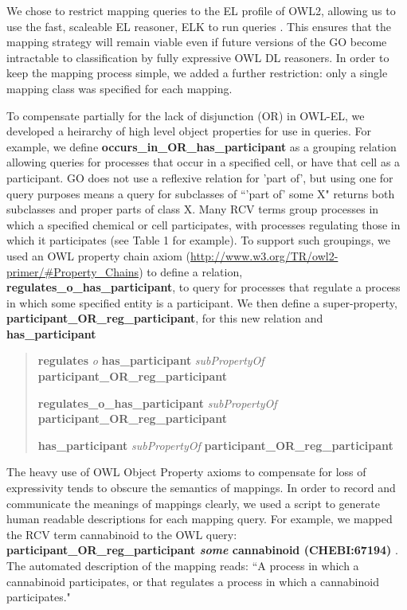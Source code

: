 \documentclass[runningheads,a4paper]{llncs}
\begin{document}
{{We chose to restrict mapping queries to the EL profile of OWL2, allowing us to use the fast, scaleable EL reasoner, ELK to run queries \cite{kazakov2012}.  This ensures that the mapping strategy will remain viable even if future versions of the GO become intractable to classification by fully expressive OWL DL reasoners. In order to keep the mapping process simple, we added a further restriction: only a single mapping class was specified for each mapping.

To compensate partially for the lack of disjunction (OR) in OWL-EL, we developed a heirarchy of high level object properties for use in queries. For example, we define \textbf{occurs\_in\_OR\_has\_participant} as a grouping relation allowing queries for processes that occur in a specified cell, or have that cell as a participant. \ac{GO} does not use a reflexive relation for 'part of', but using one for query purposes means a query for subclasses of  ``'part of' some X" returns both subclasses and proper parts of class X. Many RCV terms group processes in which a specified chemical or cell participates, with processes regulating those in which it participates (see Table 1 for example). To support such groupings, we used an OWL property chain axiom (\url{http://www.w3.org/TR/owl2-primer/#Property_Chains}) to define a relation, \textbf{regulates\_o\_has\_participant}, to query for processes that regulate a process in which some specified entity is a participant. We then define a super-property, \textbf{participant\_OR\_reg\_participant}, for this new relation and \textbf{has\_participant}

\begin{quote} %
\textbf{regulates} \textit{o} \textbf{has\_participant} \textit{subPropertyOf} \textbf{participant\_OR\_reg\_participant}

\textbf{regulates\_o\_has\_participant} \textit{subPropertyOf} \textbf{participant\_OR\_reg\_participant}

\textbf{has\_participant} \textit{subPropertyOf} \textbf{participant\_OR\_reg\_participant}
\end{quote}


The heavy use of OWL Object Property axioms to compensate for loss of expressivity tends to obscure the semantics of mappings. In order to record and communicate the meanings of mappings clearly, we used a script to generate human readable descriptions for each mapping query.  For example, we mapped the RCV term cannabinoid to the OWL query: \textbf{participant\_OR\_reg\_participant \textit{some} cannabinoid (CHEBI:67194)  }.  The automated description of the mapping reads:  ``A process in which a cannabinoid participates, or that regulates a process in which a cannabinoid participates."

}}
\end{document}
